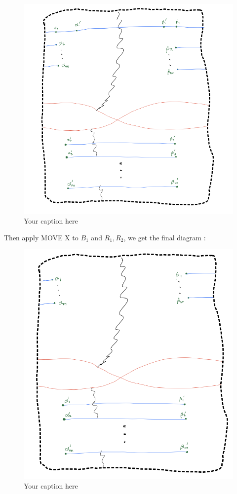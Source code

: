 \begin{figure}[H] %
    \centering
    \includegraphics[width=\linewidth]{diagrams/definition11/3.png} %
    \caption{Your caption here}
    \label{fig:your-label}
\end{figure}

Then apply MOVE \RN{10} to $B_1$ and $R_1,R_2$, we get the final diagram :

\begin{figure}[H] %
    \centering
    \includegraphics[width=\linewidth]{diagrams/definition11/4.png} %
    \caption{Your caption here}
    \label{fig:your-label}
\end{figure}